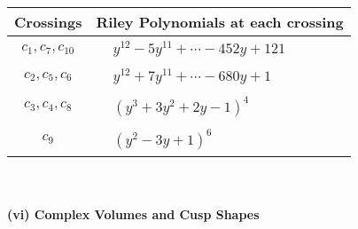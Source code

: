 \documentclass[1p]{elsarticle_modified}
\theoremstyle{definition}
\begin{document}
\begin{tabular}{m{50pt}|m{274pt}}
Crossings & \hspace{64pt}Riley Polynomials at each crossing \\
\hline $$\begin{aligned}c_{1},c_{7},c_{10}\end{aligned}$$&$\begin{aligned}
&y^{12}-5 y^{11}+\cdots-452 y+121
\end{aligned}$\\
\hline $$\begin{aligned}c_{2},c_{5},c_{6}\end{aligned}$$&$\begin{aligned}
&y^{12}+7 y^{11}+\cdots-680 y+1
\end{aligned}$\\
\hline $$\begin{aligned}c_{3},c_{4},c_{8}\end{aligned}$$&$\begin{aligned}
&(y^3+3 y^2+2 y-1)^4
\end{aligned}$\\
\hline $$\begin{aligned}c_{9}\end{aligned}$$&$\begin{aligned}
&(y^2-3 y+1)^6
\end{aligned}$\\
\hline
\end{tabular}\\~\\
\newpage\flushleft \textbf{(vi) Complex Volumes and Cusp Shapes}
\end{document}
